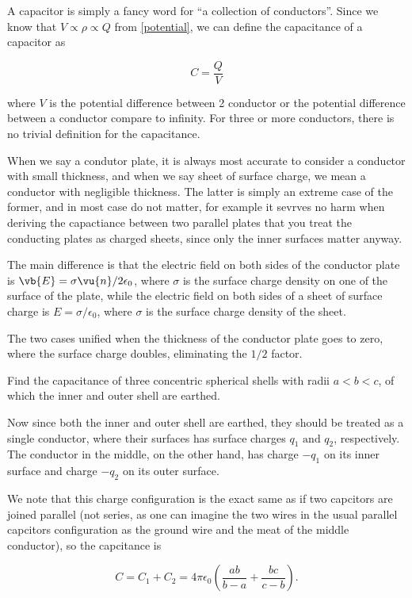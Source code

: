 \documentclass[english,a4paper,12pt]{report}
\begin{document}
A capacitor is simply a fancy word for ``a collection of conductors''. Since we know that \(V \propto \rho \propto Q\) from \cref{potential}, we can define the capacitance of a capacitor as

\begin{equation}
    C = \frac{Q}{V} 	
\end{equation}

where \(V\) is the potential difference between 2 conductor or the potential difference between a conductor compare to infinity. For three or more conductors, there is no trivial definition for the capacitance.

When we say a condutor plate, it is always most accurate to consider a conductor with small thickness, and when we say sheet of surface charge, we mean a conductor with negligible thickness. The latter is simply an extreme case of the former, and in most case do not matter, for example it sevrves no harm when deriving the capactiance between two parallel plates that you treat the conducting plates as charged sheets, since only the inner surfaces matter anyway.

The main difference is that the electric field on both sides of the conductor plate is \(\vb{E} = \sigma \vu{n} /2\epsilon _0 \), where \(\sigma \) is the surface charge density on one of the surface of the plate, while the electric field on both sides of a sheet of surface charge is \(E = \sigma /\epsilon _{0}  \), where \(\sigma \) is the surface charge density of the sheet.   

The two cases unified when the thickness of the conductor plate goes to zero, where the surface charge doubles, eliminating the \(1 /2 \) factor.  

{Find the capacitance of three concentric spherical shells with radii \(a<b<c\), of which the inner and outer shell are earthed.}
{Now since both the inner and outer shell are earthed, they should be treated as a single conductor, where their surfaces has surface charges \(q_1 \text { and } q_2 \), respectively. The conductor in the middle, on the other hand, has charge \(-q_1 \) on its inner surface and charge \(-q_2 \) on its outer surface. 

We note that this charge configuration is the exact same as if two capcitors are joined parallel (not series, as one can imagine the two wires in the usual parallel capcitors configuration as the ground wire and the meat of the middle conductor), so the capcitance is 

\begin{equation}
    C = C_1 +C_2 = 4\pi \epsilon_0 \left( \frac{ab}{b-a} + \frac{bc}{c-b}   \right).
\end{equation}
~
} 
\end{document}
